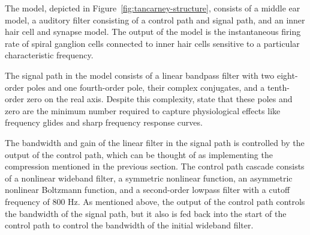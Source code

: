 
The model, depicted in
Figure~\ref{fig:tancarney-structure},
consists of a middle ear model,
a auditory filter consisting
of a control path and signal path,
and an inner hair cell
and synapse model.
The output of the model
is the instantaneous firing rate
of spiral ganglion cells
connected to inner hair cells
sensitive to a particular
characteristic frequency.

The signal path in the model
consists of a linear bandpass filter
with two eight-order poles
and one fourth-order pole,
their complex conjugates,
and a tenth-order zero
on the real axis.
Despite this complexity,
\citeauthor{tan2003}
state that these poles and zero
are the minimum number required
to capture physiological effects
like frequency glides
and sharp frequency response curves.


The bandwidth and gain of the linear filter
in the signal path is controlled
by the output of the control path,
which can be thought of as
implementing the compression
mentioned in the previous section.
The control path cascade consists of
a nonlinear wideband filter,
a symmetric nonlinear function,
an asymmetric nonlinear Boltzmann function,
and a second-order lowpass filter
with a cutoff frequency of 800 Hz.
As mentioned above,
the output of the control path
controls the bandwidth
of the signal path,
but it also is fed back
into the start of the control path
to control the bandwidth of the initial
wideband filter.

